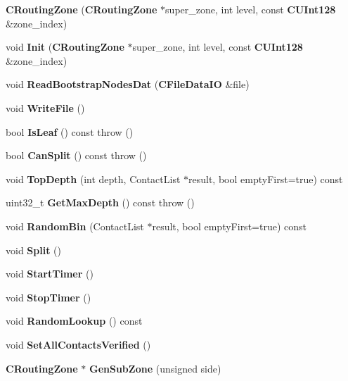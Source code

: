 \begin{DoxyCompactItemize}
\item 
{\bfseries CRoutingZone} ({\bf CRoutingZone} $\ast$super\_\-zone, int level, const {\bf CUInt128} \&zone\_\-index)\label{classKademlia_1_1CRoutingZone_a521b12b4231bb956a213a777a7ebfbeb}

\item 
void {\bfseries Init} ({\bf CRoutingZone} $\ast$super\_\-zone, int level, const {\bf CUInt128} \&zone\_\-index)\label{classKademlia_1_1CRoutingZone_ad458d39996d1c74a32ddebdb0a62e793}

\item 
void {\bfseries ReadBootstrapNodesDat} ({\bf CFileDataIO} \&file)\label{classKademlia_1_1CRoutingZone_a56a6841e91c91e6e73a76c7cd8c10b92}

\item 
void {\bfseries WriteFile} ()\label{classKademlia_1_1CRoutingZone_a6beab2fdfc38f8564b5042aa452e26a3}

\item 
bool {\bfseries IsLeaf} () const   throw ()\label{classKademlia_1_1CRoutingZone_a68374dbaa68d58884ac29dc4dcd11efa}

\item 
bool {\bfseries CanSplit} () const   throw ()\label{classKademlia_1_1CRoutingZone_a0f2ae7627ac9b89e7dd387e5ac3471b4}

\item 
void {\bfseries TopDepth} (int depth, ContactList $\ast$result, bool emptyFirst=true) const \label{classKademlia_1_1CRoutingZone_a5b4d82fc072cb5cdd86b966086d9a49f}

\item 
uint32\_\-t {\bfseries GetMaxDepth} () const   throw ()\label{classKademlia_1_1CRoutingZone_abe3436652beb50ed0f73d6b651739bf9}

\item 
void {\bfseries RandomBin} (ContactList $\ast$result, bool emptyFirst=true) const \label{classKademlia_1_1CRoutingZone_aa7513e2dcf754ef4306a588c5c0d2f31}

\item 
void {\bfseries Split} ()\label{classKademlia_1_1CRoutingZone_af081577275032a9fea254359f653cd25}

\item 
void {\bfseries StartTimer} ()\label{classKademlia_1_1CRoutingZone_a6a0621a5de4ede38107e33af82af6ebd}

\item 
void {\bfseries StopTimer} ()\label{classKademlia_1_1CRoutingZone_a6f920064d30da046bc2fb595ae02013f}

\item 
void {\bfseries RandomLookup} () const \label{classKademlia_1_1CRoutingZone_a3a0c7eeeda1b14f47da01da16cdc6f4f}

\item 
void {\bfseries SetAllContactsVerified} ()\label{classKademlia_1_1CRoutingZone_a45a720e6e06ce40b4bb1bfd13143fcbf}

\item 
{\bf CRoutingZone} $\ast$ {\bf GenSubZone} (unsigned side)
\end{DoxyCompactItemize}
